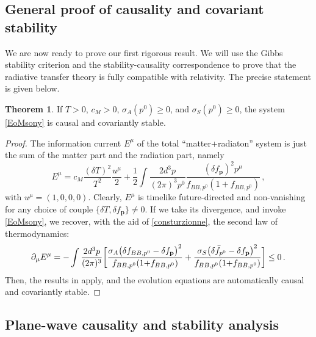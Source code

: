 \documentclass[a4paper, amsfonts, amssymb, amsmath, reprint, showkeys, nofootinbib, twoside,notitlepage,onecolumn]{revtex4-2}
\theoremstyle{definition}
\theoremstyle{theorem}
\newtheorem{theorem}{Theorem}
\theoremstyle{corollary}
\begin{document}
\subsection{General proof of causality and covariant stability}

We are now ready to prove our first rigorous result. We will use the Gibbs stability criterion \cite{GavassinoGibbs2021,GavassinoStabilityCarter2022,GavassinoGENERIC2022} and the stability-causality correspondence \cite{GavassinoCausality2021,GavassinoSuperluminal2021} to prove that the radiative transfer theory is fully compatible with relativity. The precise statement is given below.
\begin{theorem}\label{Theo1}
If $T>0$, $c_M>0$, $\sigma_A(p^0)\geq 0$, and $\sigma_S(p^0)\geq 0$, the system \eqref{EoMsony} is causal and covariantly stable.
\end{theorem}
\begin{proof}
The information current $E^\mu$ of the total ``matter+radiaton'' system is just the sum of the matter part and the radiation part, namely \cite{GavassinoGibbs2021,GavassinoCausality2021,GavassinoNonHydro2022,RochaGavassinoFluctuKin2024afv}
\begin{equation}
E^\mu =c_M \dfrac{(\delta T)^2}{T^2} \dfrac{u^\mu}{2} +\dfrac{1}{2} \int \dfrac{2d^3 p}{(2\pi)^3 p^0}  \dfrac{(\delta f_\mathbf{p})^2 p^\mu}{f_{BB,p^0}(1{+}f_{BB,p^0})} \, ,
\end{equation}
with $u^\mu=(1,0,0,0)$.
Clearly, $E^\mu$ is timelike future-directed and non-vanishing for any choice of couple $\{\delta T,\delta f_\mathbf{p} \}\neq 0$. If we take its divergence, and invoke \eqref{EoMsony}, we recover, with the aid of \eqref{consturzionne}, the second law of thermodynamics:
\begin{equation}\label{secondlaw}
\partial_\mu E^\mu = -\int \dfrac{2d^3p}{(2\pi)^3} \bigg[ \dfrac{\sigma_A\big(\delta f_{BB,p^0}-\delta f_\mathbf{p}\big)^2}{f_{BB,p^0}(1{+}f_{BB,p^0})} +\dfrac{\sigma_S \big(\delta \Bar{f}_{p^0} -\delta f_\mathbf{p}\big)^2}{f_{BB,p^0}(1{+}f_{BB,p^0})}\bigg] \leq 0 \, .
\end{equation}
Then, the results in \cite{GavassinoGibbs2021,GavassinoCasmir2022} apply, and the evolution equations are automatically causal and covariantly stable.
\end{proof}

\subsection{Plane-wave causality and stability analysis}
\end{document}
